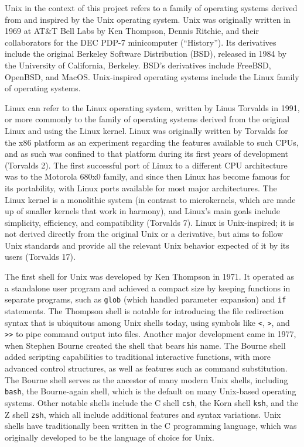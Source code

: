 \documentclass[12pt]{article}
\begin{document}
\begin{flushleft}
			Unix in the context of this project refers to a family of operating systems derived from and inspired by the Unix operating system. Unix was originally written in 1969 at AT\&T Bell Labs by Ken Thompson, Dennis Ritchie, and their collaborators for the DEC PDP-7 minicomputer (“History”). Its derivatives include the original Berkeley Software Distribution (BSD), released in 1984 by the University of California, Berkeley. BSD’s derivatives include FreeBSD, OpenBSD, and MacOS. Unix-inspired operating systems include the Linux family of operating systems.

			Linux can refer to the Linux operating system, written by Linus Torvalds in 1991, or more commonly to the family of operating systems derived from the original Linux and using the Linux kernel. Linux was originally written by Torvalds for the x86 platform as an experiment regarding the features available to such CPUs, and as such was confined to that platform during its first years of development (Torvalds 2). The first successful port of Linux to a different CPU architecture was to the Motorola 680x0 family, and since then Linux has become famous for its portability, with Linux ports available for most major architectures. The Linux kernel is a monolithic system (in contrast to microkernels, which are made up of smaller kernels that work in harmony), and Linux’s main goals include simplicity, efficiency, and compatibility (Torvalds 7). Linux is Unix-inspired; it is not derived directly from the original Unix or a derivative, but aims to follow Unix standards and provide all the relevant Unix behavior expected of it by its users (Torvalds 17).

			The first shell for Unix was developed by Ken Thompson in 1971. It operated as a standalone user program and achieved a compact size by keeping functions in separate programs, such as \verb|glob| (which handled parameter expansion) and \verb|if| statements. The Thompson shell is notable for introducing the file redirection syntax that is ubiquitous among Unix shells today, using symbols like \verb|<|, \verb|>|, and \verb|>>| to pipe command output into files. Another major development came in 1977, when Stephen Bourne created the shell that bears his name. The Bourne shell added scripting capabilities to traditional interactive functions, with more advanced control structures, as well as features such as command substitution. The Bourne shell serves as the ancestor of many modern Unix shells, including \verb|bash|, the Bourne-again shell, which is the default on many Unix-based operating systems. Other notable shells include the C shell \verb|csh|, the Korn shell \verb|ksh|, and the Z shell \verb|zsh|, which all include additional features and syntax variations. Unix shells have traditionally been written in the C programming language, which was originally developed to be the language of choice for Unix.


\end{flushleft}
\end{document}
